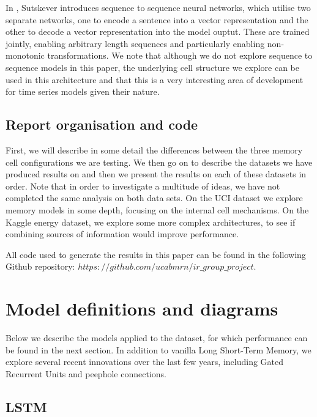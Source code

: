 \documentclass{article} %
\begin{document}
In \cite{Sutskever}, Sutskever introduces sequence to sequence neural networks, which utilise two separate networks, one to encode a sentence into a vector representation and the other to decode a vector representation into the model ouptut. These are trained jointly, enabling arbitrary length sequences and particularly enabling non-monotonic transformations. We note that although we do not explore sequence to sequence models in this paper, the underlying cell structure we explore can be used in this architecture and that this is a very interesting area of development for time series models given their nature.  

\subsection{Report organisation and code}

First, we will describe in some detail the differences between the three memory cell configurations we are testing. We then go on to describe the datasets we have produced results on and then we present the results on each of these datasets in order. Note that in order to investigate a multitude of ideas, we have not completed the same analysis on both data sets. On the UCI dataset we explore memory models in some depth, focusing on the internal cell mechanisms. On the Kaggle energy dataset, we explore some more complex architectures, to see if combining sources of information would improve performance.

All code used to generate the results in this paper can be found in the following Github repository: $https://github.com/ucabmrn/ir\_group\_project$. 



\section{Model definitions and diagrams}
\label{sec:nn}

Below we describe the models applied to the dataset, for which performance can be found in the next section. In addition to vanilla Long Short-Term Memory, we explore several recent innovations over the last few years, including Gated Recurrent Units and peephole connections. 



\subsection{LSTM}
\label{sec:nn/lstm}
\end{document}
